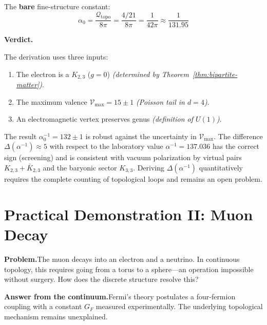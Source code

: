 The \textbf{bare} fine-structure constant:
\begin{equation}
  \boxed{\;
  \alpha_0
  = \frac{\mathcal{Q}_{\mathrm{topo}}}{8\pi}
  = \frac{4/21}{8\pi}
  = \frac{1}{42\pi}
  \approx \frac{1}{131{.}95}
  \;}
  \tag{$\alpha$-I}
\end{equation}

\bigskip
\noindent
\textbf{Verdict.}

\begin{result}[title={Complete inventory of the derivation}]
The derivation uses three inputs:
\begin{enumerate}
  \item The electron is a $K_{2,3}$ ($g = 0$)
    \hfill\textit{(determined by Theorem~\ref{thm:bipartite-matter})}.
  \item The maximum valence $\mathcal{V}_{\max} = 15 \pm 1$
    \hfill\textit{(Poisson tail in $d = 4$)}.
  \item An electromagnetic vertex preserves genus
    \hfill\textit{(definition of $U(1)$)}.
\end{enumerate}
The result $\alpha_0^{-1} = 132 \pm 1$ is robust against the
uncertainty in $\mathcal{V}_{\max}$. The difference
$\Delta(\alpha^{-1}) \approx 5$ with respect to the laboratory value
$\alpha^{-1} = 137{.}036$ has the correct sign (screening) and is
consistent with vacuum polarization by virtual pairs
$K_{2,3} + \bar{K}_{2,3}$ and the baryonic sector $K_{3,3}$.
Deriving $\Delta(\alpha^{-1})$ quantitatively requires the complete
counting of topological loops and remains an open problem.
\end{result}

\bigskip

\section*{Practical Demonstration II: Muon Decay}
\label{sec:demo-muon}

\noindent\textbf{Problem.}\enspace The muon decays into an electron and a
neutrino. In continuous topology, this requires going from a torus to a
sphere---an operation impossible without surgery. How does the discrete
structure resolve this?

\noindent\textbf{Answer from the continuum.}\enspace Fermi's theory
postulates a four-fermion coupling with a constant $G_F$ measured
experimentally. The underlying topological mechanism remains unexplained.

